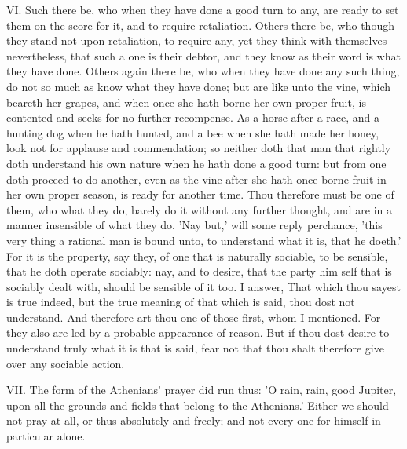 VI. Such there be, who when they have done a good turn to any, are ready
to set them on the score for it, and to require retaliation. Others there
be, who though they stand not upon retaliation, to require any, yet they
think with themselves nevertheless, that such a one is their debtor, and
they know as their word is what they have done. Others again there be, who
when they have done any such thing, do not so much as know what they have
done; but are like unto the vine, which beareth her grapes, and when once
she hath borne her own proper fruit, is contented and seeks for no further
recompense. As a horse after a race, and a hunting dog when he hath
hunted, and a bee when she hath made her honey, look not for applause and
commendation; so neither doth that man that rightly doth understand his
own nature when he hath done a good turn: but from one doth proceed to do
another, even as the vine after she hath once borne fruit in her own
proper season, is ready for another time. Thou therefore must be one of
them, who what they do, barely do it without any further thought, and are
in a manner insensible of what they do. 'Nay but,' will some reply
perchance, 'this very thing a rational man is bound unto, to understand
what it is, that he doeth.' For it is the property, say they, of one that
is naturally sociable, to be sensible, that he doth operate sociably: nay,
and to desire, that the party him self that is sociably dealt with, should
be sensible of it too. I answer, That which thou sayest is true indeed,
but the true meaning of that which is said, thou dost not understand. And
therefore art thou one of those first, whom I mentioned. For they also are
led by a probable appearance of reason. But if thou dost desire to
understand truly what it is that is said, fear not that thou shalt
therefore give over any sociable action.

VII. The form of the Athenians' prayer did run thus: 'O rain, rain, good
Jupiter, upon all the grounds and fields that belong to the Athenians.'
Either we should not pray at all, or thus absolutely and freely; and not
every one for himself in particular alone.

